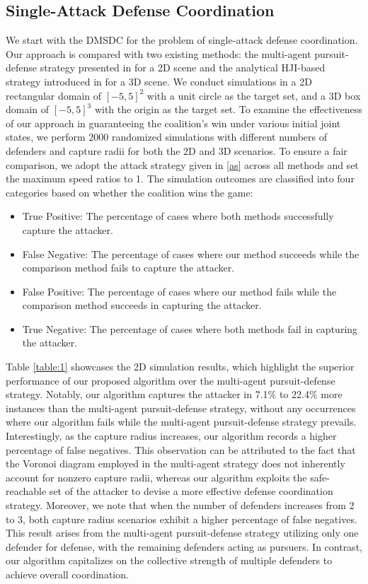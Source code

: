 \documentclass[journal]{IEEEtran}
\newcommand{\1}{\mathbf{1}}
\begin{document}
\subsection{Single-Attack Defense Coordination}\label{sec:V1}

We start with the DMSDC for the problem of single-attack defense coordination. Our approach is compared with two existing methods: the multi-agent pursuit-defense strategy presented in \cite{deng2020multi} for a 2D scene and the analytical HJI-based strategy introduced in \cite{garcia2020optimal} for a 3D scene. We conduct simulations in a 2D rectangular domain of $[-5,5]^2$ with a unit circle as the target set, and a 3D box domain of $[-5,5]^3$ with the origin as the target set. To examine the effectiveness of our approach in guaranteeing the coalition's win under various initial joint states, we perform 2000 randomized simulations with different numbers of defenders and capture radii for both the 2D and 3D scenarios. To ensure a fair comparison, we adopt the attack strategy given in \eqref{as} across all methods and set the maximum speed ratios to 1. The simulation outcomes are classified into four categories based on whether the coalition wins the game:
\begin{itemize}
    \item True Positive: The percentage of cases where both methods successfully capture the attacker.
    \item False Negative: The percentage of cases where our method succeeds while the comparison method fails to capture the attacker.
    \item False Positive: The percentage of cases where our method fails while the comparison method succeeds in capturing the attacker.
    \item True Negative: The percentage of cases where both methods fail in capturing the attacker.
\end{itemize}

Table \ref{table:1} showcases the 2D simulation results, which highlight the superior performance of our proposed algorithm over the multi-agent pursuit-defense strategy. Notably, our algorithm captures the attacker in 7.1\% to 22.4\% more instances than the multi-agent pursuit-defense strategy, without any occurrences where our algorithm fails while the multi-agent pursuit-defense strategy prevails. Interestingly, as the capture radius increases, our algorithm records a higher percentage of false negatives. This observation can be attributed to the fact that the Voronoi diagram employed in the multi-agent strategy does not inherently account for nonzero capture radii, whereas our algorithm exploits the safe-reachable set of the attacker to devise a more effective defense coordination strategy. Moreover, we note that when the number of defenders increases from 2 to 3, both capture radius scenarios exhibit a higher percentage of false negatives. This result arises from the multi-agent pursuit-defense strategy utilizing only one defender for defense, with the remaining defenders acting as pursuers. In contrast, our algorithm capitalizes on the collective strength of multiple defenders to achieve overall coordination.
\end{document}
